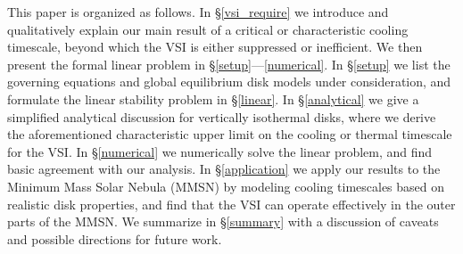 \documentclass[iop]{emulateapj}
\begin{document}

This paper is organized as follows. In \S\ref{vsi_require} we 
introduce and qualitatively explain our main result of a critical or
characteristic cooling timescale, beyond which the VSI is either
suppressed or inefficient. We then present the  
formal linear problem in \S\ref{setup}---\ref{numerical}.    
In \S\ref{setup} we list the governing equations and global
equilibrium disk models under consideration, and formulate the linear
stability problem in \S\ref{linear}. In 
\S\ref{analytical} we give a simplified analytical discussion for
vertically isothermal disks, where we derive the aforementioned
characteristic upper limit on the cooling or thermal timescale for the VSI. 
In \S\ref{numerical} we numerically
solve the linear problem, and  
find basic agreement with our analysis.
In 
\S\ref{application} we apply our results to the Minimum Mass
Solar Nebula (MMSN) by modeling cooling timescales based on realistic
disk properties, and find that the VSI can operate effectively in the
outer parts of the MMSN. We summarize in \S\ref{summary} with a
discussion of caveats and possible directions for future work.  
\end{document}
